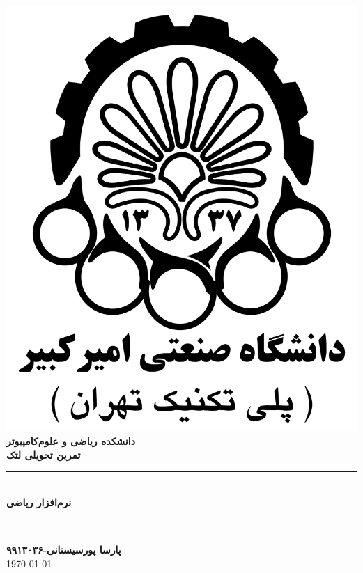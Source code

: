 \documentclass[]{article}
\author{پارسا پورسیستانی-۹۹۱۳۰۳۶}
\begin{document}
\begin{titlepage}
\newcommand{\HRule}{\rule{\linewidth}{0.5mm}} 

\center 

\includegraphics[scale=0.15]{logo2.png}\\[1cm]
\textsc{\LARGE \bfseries دانشکده ریاضی و علوم‌کامپیوتر}\\[0.7cm] 
\textsc{\Large \bfseries تمرین تحویلی لتک}\\[0.5cm] 
\HRule \\[0.4cm]
{ \huge \bfseries نرم‌افزار ریاضی}\\[0.4cm]
\HRule \\[1cm]
\textsc{\LARGE \bfseries پارسا پورسیستانی-۹۹۱۳۰۳۶}\\[0.7cm]
\today
\end{titlepage}
\newpage
{}
  
\end{document}
